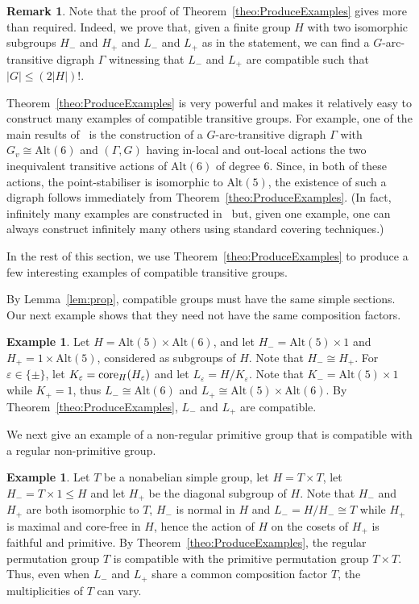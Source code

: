 \documentclass[twoside,12pt,leqno]{amsproc}
\numberwithin{table}{section}
\numberwithin{figure}{section}
\theoremstyle{plain}
\theoremstyle{definition}\newtheorem{definition}[theorem]{Definition}
\theoremstyle{definition}\newtheorem{example}[theorem]{Example}
\theoremstyle{definition}\newtheorem{construction}[theorem]{Construction}
\theoremstyle{definition}\newtheorem{remark}[theorem]{Remark}
\theoremstyle{definition}\newtheorem{problem}[theorem]{Problem}
\begin{document}
\begin{remark}
Note that the proof of Theorem~\ref{theo:ProduceExamples} gives more than required. Indeed, we prove that, given a finite group $H$ with two isomorphic subgroups $H_-$ and $H_+$ and $L_-$ and $L_+$ as in the statement, we can find a $G$-arc-transitive digraph $\Gamma$ witnessing that $L_-$ and $L_+$ are compatible such that $|G|{\leqslant} (2|H|)!$.
\end{remark}

Theorem~\ref{theo:ProduceExamples} is very powerful and makes it relatively easy to construct many examples of compatible transitive groups. For example, one of the main results of~\cite{CLP} is the construction of a $G$-arc-transitive digraph $\Gamma$ with  $G_v\cong{\textrm{Alt}}(6)$ and $(\Gamma,G)$ having in-local and out-local actions the two inequivalent transitive actions of ${\textrm{Alt}}(6)$ of degree $6$. Since, in both of these actions, the point-stabiliser is isomorphic to ${\textrm{Alt}}(5)$, the existence of such a digraph follows immediately from Theorem~\ref{theo:ProduceExamples}. (In fact, infinitely many examples are constructed in~\cite{CLP} but, given one example, one can always construct infinitely many others using standard covering techniques.)

In the rest of this section, we use Theorem~\ref{theo:ProduceExamples} to produce a few interesting examples of compatible transitive groups.

By Lemma~\ref{lem:prop}, compatible groups must have the same simple sections.  Our next example shows that they need not have the same composition factors.
\begin{example}
Let $H={\textrm{Alt}}(5)\times{\textrm{Alt}}(6)$, and let $H_-={\textrm{Alt}}(5)\times 1$ and $H_+=1\times{\textrm{Alt}}(5)$, considered as subgroups of $H$. Note that $H_-\cong H_+$. For ${\varepsilon}\in\{\pm\}$, let $K_{\varepsilon}=\textup{core}_H(H_{\varepsilon})$ and let $L_{\varepsilon}=H/K_{\varepsilon}$. Note that $K_-={\textrm{Alt}}(5)\times 1$ while $K_+=1$, thus $L_-\cong{\textrm{Alt}}(6)$ and $L_+\cong{\textrm{Alt}}(5)\times{\textrm{Alt}}(6)$. By Theorem~\ref{theo:ProduceExamples}, $L_-$ and $L_+$ are compatible.
\end{example}

We next give an example of a non-regular primitive group that is compatible with a regular non-primitive group.

\begin{example}\label{eg:primnotcompat}
Let $T$ be a nonabelian simple group, let  $H=T\times T$, let $H_-=T\times 1{\leqslant} H$ and let $H_+$ be the diagonal subgroup of $H$. Note that $H_-$ and $H_+$ are both isomorphic to $T$, $H_-$ is normal in $H$ and $L_-=H/H_-\cong T$ while $H_+$ is maximal and core-free in $H$, hence the action of $H$ on the cosets of $H_+$ is faithful and primitive. By Theorem~\ref{theo:ProduceExamples}, the regular permutation group $T$ is compatible with the primitive permutation group $T\times T$. Thus, even when $L_-$ and $L_+$ share a common composition factor $T$, the multiplicities of $T$ can vary.
\end{example}
\end{document}
